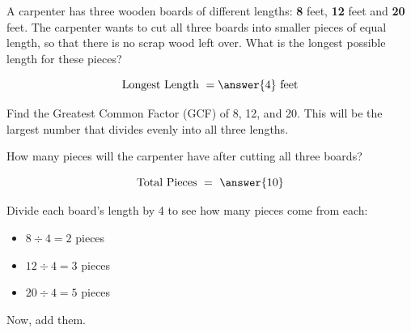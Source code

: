 \documentclass{ximera}[font=12pt]  %
\begin{document}
\begin{problem}
  A carpenter has three wooden boards of different lengths: \textbf{8} feet, \textbf{12} feet and
      \textbf{20} feet.  The carpenter wants to cut all three boards into smaller pieces of equal length,
       so that there is no scrap wood left over. What is the longest possible length for these pieces?

  \[ \textrm{Longest Length } = \answer{4} \ \textrm{feet} \] 

  \begin{hint}
    Find the Greatest Common Factor (GCF) of 8, 12, and 20. This will be the largest number that divides evenly into all three lengths.
  \end{hint}

How many pieces will the carpenter have after cutting all three boards?

  \[ \textrm{Total Pieces } = \ \answer{10} \] 

  \begin{hint}
    Divide each board's length by 4 to see how many pieces come from each:
    \begin{itemize}
        \item $8 \div 4 = 2$ pieces
        \item $12 \div 4 = 3$ pieces
        \item $20 \div 4 = 5$ pieces
    \end{itemize}
    Now, add them.
  \end{hint}
\end{problem}
\end{document}

